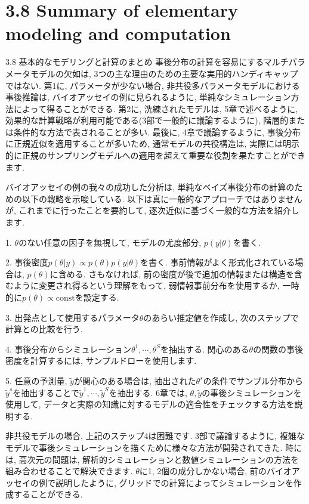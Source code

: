 \documentclass[10pt,dvipdfmx,a4]{beamer}
\begin{document}
\section{3.8 Summary of elementary modeling and computation}
\begin{frame}{3.8 基本的なモデリングと計算のまとめ}
事後分布の計算を容易にするマルチパラメータモデルの欠如は, 3つの主な理由のための主要な実用的ハンディキャップではない.
第1に, パラメータが少ない場合, 非共役多パラメータモデルにおける事後推論は, バイオアッセイの例に見られるように, 単純なシミュレーション方法によって得ることができる.
第2に, 洗練されたモデルは, 5章で述べるように, 効果的な計算戦略が利用可能である(3部で一般的に議論するように), 階層的または条件的な方法で表されることが多い.
最後に, 4章で議論するように, 事後分布に正規近似を適用することが多いため, 通常モデルの共役構造は, 実際には明示的に正規のサンプリングモデルへの適用を超えて重要な役割を果たすことができます.

バイオアッセイの例の我々の成功した分析は, 単純なベイズ事後分布の計算のための以下の戦略を示唆している.
以下は真に一般的なアプローチではありませんが, これまでに行ったことを要約して, 逐次近似に基づく一般的な方法を紹介します.
\end{frame}


\begin{frame}
1. $\theta$のない任意の因子を無視して, モデルの尤度部分, $p(y|\theta)$を書く.

2. 事後密度$p(\theta|y)\propto p(\theta)p(y|\theta)$を書く.
事前情報がよく形式化されている場合は, $p(\theta)$に含める.
さもなければ, 前の密度が後で追加の情報または構造を含むように変更され得るという理解をもって, 弱情報事前分布を使用するか, 一時的に$p(\theta)\propto\text{const}$を設定する.

3. 出発点として使用するパラメータ$\theta$のあらい推定値を作成し, 次のステップで計算との比較を行う.

4. 事後分布からシミュレーション$\theta^1,\cdots, \theta^S$を抽出する.
関心のある$\theta$の関数の事後密度を計算するには, サンプルドローを使用します.

5. 任意の予測量, $\tilde{y}$が関心のある場合は, 抽出された$\theta^s$の条件でサンプル分布から$\tilde{y}^s$を抽出することで$\tilde{y}^1,\cdots,\tilde{y}^S$を抽出する.
6章では, $\theta, \tilde{y}$の事後シミュレーションを使用して, データと実際の知識に対するモデルの適合性をチェックする方法を説明する.

非共役モデルの場合, 上記のステップ4は困難です.
3部で議論するように, 複雑なモデルで事後シミュレーションを描くために様々な方法が開発されてきた.
時には, 高次元の問題は, 解析的シミュレーションと数値シミュレーションの方法を組み合わせることで解決できます.
$\theta$に1, 2個の成分しかない場合, 前のバイオアッセイの例で説明したように, グリッドでの計算によってシミュレーションを作成することができる.
\end{frame}

\end{document}
